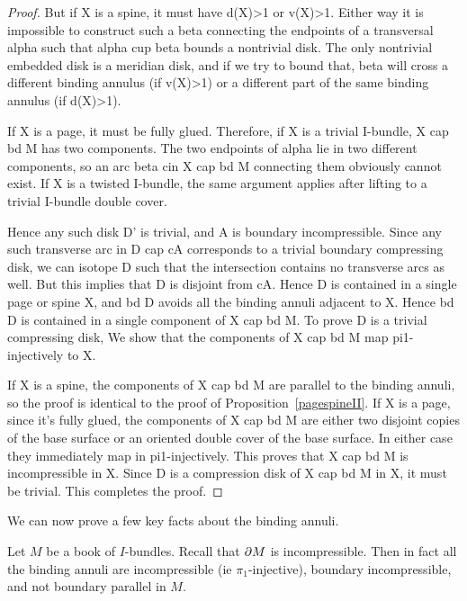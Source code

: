 \begin{proof}
But if X is a spine, it must have d(X)>1 or v(X)>1. Either way it is impossible
to construct such a beta connecting the endpoints of a transversal alpha such
that alpha cup beta bounds a nontrivial disk. The only nontrivial embedded disk
is a meridian disk, and if we try to bound that, beta will cross a different
binding annulus (if v(X)>1) or a different part of the same binding annulus (if
d(X)>1).

If X is a page, it must be fully glued. Therefore, if X is a trivial I-bundle,
X cap bd M has two components. The two endpoints of alpha lie in two different
components, so an arc beta cin X cap bd M connecting them obviously cannot
exist. If X is a twisted I-bundle, the same argument applies after lifting to
a trivial I-bundle double cover.

Hence any such disk D' is trivial, and A is boundary incompressible. Since any
such transverse arc in D cap cA corresponds to a trivial boundary compressing
disk, we can isotope D such that the intersection contains no transverse arcs
as well. But this implies that D is disjoint from cA. Hence D is contained in
a single page or spine X, and bd D avoids all the binding annuli adjacent to X.
Hence bd D is contained in a single component of X cap bd M. To prove D is
a trivial compressing disk, We show that the components of X cap bd M map
pi1-injectively to X.

If X is a spine, the components of X cap bd M are parallel to the binding
annuli, so the proof is identical to the proof of
Proposition~\ref{pagespineII}. If X is a page, since it's fully glued, the
components of X cap bd M are either two disjoint copies of the base surface or
an oriented double cover of the base surface. In either case they immediately
map in pi1-injectively. This proves that X cap bd M is incompressible in X.
Since D is a compression disk of X cap bd M in X, it must be trivial. This
completes the proof.

\end{proof}

We can now prove a few key facts about the binding annuli.

\begin{prop}

Let $M$ be a book of $I$-bundles. Recall that $\partial M$ is incompressible.  Then
in fact all the binding annuli are incompressible (ie $\pi_1$-injective),
boundary incompressible, and not boundary parallel in $M$.

\end{prop}

